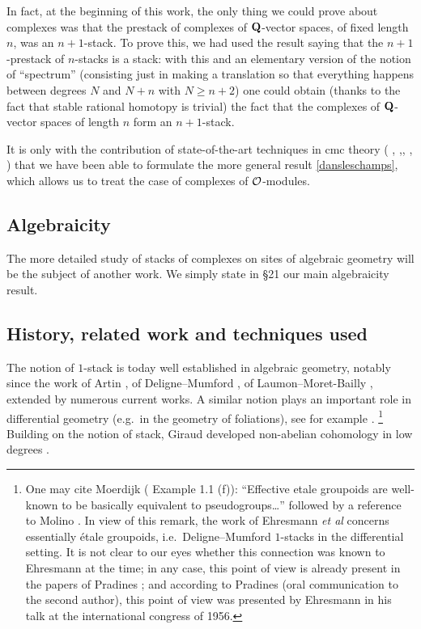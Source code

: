 In fact, at the beginning of this work, the only thing we could prove about
complexes was that the prestack of complexes of ${\bf Q}$-vector spaces, of fixed
length $n$, was an $n+1$-stack. To prove this, we had used the result saying
that the $n+1$-prestack of $n$-stacks is a stack: with this and an elementary
version of the notion of ``spectrum'' (consisting just in making a translation
so that everything happens between degrees $N$ and $N+n$ with $N\geq n+2$)
one could obtain (thanks to the fact that stable rational homotopy is
trivial) the fact that the complexes of ${\bf Q}$-vector spaces of length $n$
form an $n+1$-stack.

It is only with the contribution of state-of-the-art techniques in cmc theory
(\cite{DwyerKan1} \cite{DwyerKan2} \cite{DwyerKan3} \cite{DwyerKanDiags},
\cite{Hirschhorn},\cite{DHK}, \cite{JardineGoerssBook}, \cite{HoveyMonMod}
\cite{HoveyBook}) that we have been able to formulate the more general result
\ref{dansleschamps}, which allows us to treat the case of complexes of
${\cal O}$-modules.

\subsection*{Algebraicity}

The more detailed study of stacks of complexes on sites of algebraic geometry
will be the subject of another work. We simply state in \S21 our main
algebraicity result.

\subsection*{History, related work and techniques used}

The notion of $1$-stack is today well established in algebraic geometry,
notably since the work of Artin \cite{ArtinInventiones}, of
Deligne--Mumford \cite{Deligne-Mumford}, of Laumon--Moret-Bailly
\cite{LaumonMB}, extended by numerous current works. A similar notion plays
an important role in differential geometry (e.g.\ in the geometry of
foliations), see for example \cite{Ehresmann} \cite{Morita} \cite{Pradines}
\cite{Haefliger} \cite{Haefliger2} \cite{Molino} \cite{Moerdijk}.
%
\footnote{One may cite Moerdijk (\cite{Moerdijk} Example 1.1 (f)):
``Effective etale groupoids are well-known to be basically equivalent to
pseudogroups\ldots'' followed by a reference to Molino \cite{Molino}. In view
of this remark, the work of Ehresmann \emph{et al} concerns essentially
étale groupoids, i.e.\ Deligne--Mumford $1$-stacks in the differential
setting. It is not clear to our eyes whether this connection was known to
Ehresmann at the time; in any case, this point of view is already present in
the papers of Pradines \cite{Pradines}; and according to Pradines (oral
communication to the second author), this point of view was presented by
Ehresmann in his talk at the international congress of 1956.}
%
Building on the notion of stack, Giraud developed non-abelian cohomology in
low degrees \cite{Giraud}.


